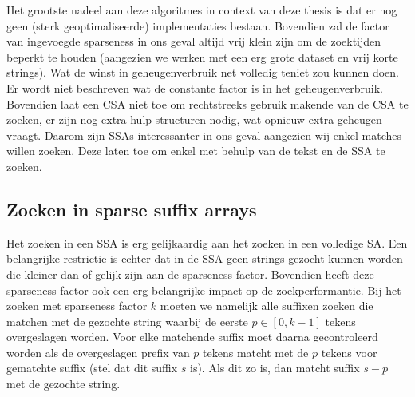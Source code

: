 Het grootste nadeel aan deze algoritmes in context van deze thesis is dat er nog geen (sterk geoptimaliseerde) implementaties bestaan.
Bovendien zal de factor van ingevoegde sparseness in ons geval altijd vrij klein zijn om de zoektijden beperkt te houden (aangezien we werken met een erg grote dataset en vrij korte strings).
Wat de winst in geheugenverbruik net volledig teniet zou kunnen doen.
Er wordt niet beschreven wat de constante factor is in het geheugenverbruik.
Bovendien laat een CSA niet toe om rechtstreeks gebruik makende van de CSA te zoeken, er zijn nog extra hulp structuren nodig, wat opnieuw extra geheugen vraagt.
Daarom zijn SSAs interessanter in ons geval aangezien wij enkel matches willen zoeken.
Deze laten toe om enkel met behulp van de tekst en de SSA te zoeken.

\subsection{Zoeken in sparse suffix arrays}
Het zoeken in een SSA is erg gelijkaardig aan het zoeken in een volledige SA\@.
Een belangrijke restrictie is echter dat in de SSA geen strings gezocht kunnen worden die kleiner dan of gelijk zijn aan de sparseness factor.
Bovendien heeft deze sparseness factor ook een erg belangrijke impact op de zoekperformantie.
Bij het zoeken met sparseness factor $k$ moeten we namelijk alle suffixen zoeken die matchen met de gezochte string waarbij de eerste $p \in [0, k-1]$ tekens overgeslagen worden.
Voor elke matchende suffix moet daarna gecontroleerd worden als de overgeslagen prefix van $p$ tekens matcht met de $p$ tekens voor gematchte suffix (stel dat dit suffix $s$ is).
Als dit zo is, dan matcht suffix $s - p$ met de gezochte string.



